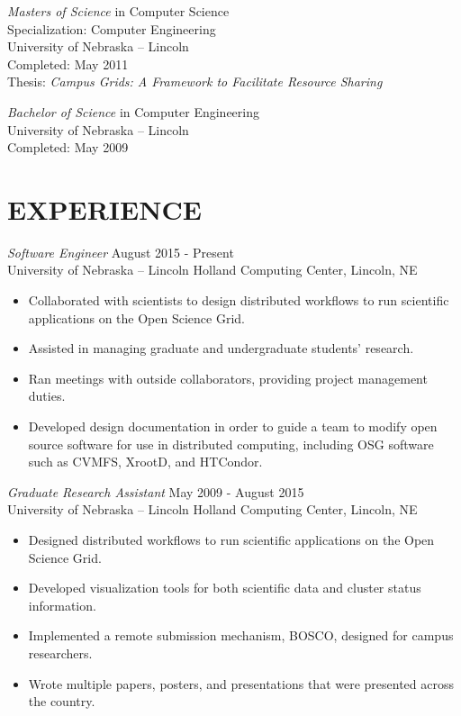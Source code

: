 \documentclass[margin]{res}
\begin{document}
\begin{resume}
                {\sl Masters of Science} in Computer Science \\
                Specialization: Computer Engineering \\
                University of Nebraska -- Lincoln \\
                Completed: May 2011 \\
                Thesis: \textit{Campus Grids: A Framework to Facilitate Resource Sharing}
                
                {\sl Bachelor of Science} in Computer Engineering \\
                University of Nebraska -- Lincoln \\
                Completed: May 2009 
                

\section{EXPERIENCE}
 {\sl Software Engineer} \hfill       August 2015 - Present \\
 University of Nebraska -- Lincoln Holland Computing Center, Lincoln, NE
 \begin{itemize} \itemsep -2pt
 	\item Collaborated with scientists to design distributed workflows to run scientific applications on the Open Science Grid.
 	\item Assisted in managing graduate and undergraduate students' research.
 	\item Ran meetings with outside collaborators, providing project management duties.
 	\item Developed design documentation in order to guide a team to modify open source software for use in distributed computing, including OSG software such as CVMFS, XrootD, and HTCondor.
 \end{itemize}


 {\sl Graduate Research Assistant} \hfill       May 2009 - August 2015 \\
 University of Nebraska -- Lincoln Holland Computing Center, Lincoln, NE
 \begin{itemize} \itemsep -2pt
 	\item Designed distributed workflows to run scientific applications on the Open Science Grid.
 	\item Developed visualization tools for both scientific data and cluster status information.
 	\item Implemented a remote submission mechanism, BOSCO, designed for campus researchers.
 	\item Wrote multiple papers, posters, and presentations that were presented across the country.
 \end{itemize}
 

\end{resume}
\end{document}
